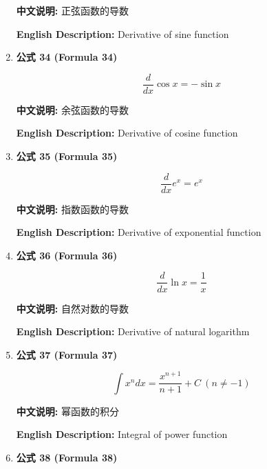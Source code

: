 \documentclass[12pt,a4paper]{article}
\begin{document}
\begin{enumerate}[leftmargin=*]
\textbf{中文说明:} 正弦函数的导数

\textbf{English Description:} Derivative of sine function

\vspace{0.5cm}

\item \textbf{公式 34 (Formula 34)}

\begin{equation}
\frac{d}{dx}\cos x = -\sin x
\end{equation}

\textbf{中文说明:} 余弦函数的导数

\textbf{English Description:} Derivative of cosine function

\vspace{0.5cm}

\item \textbf{公式 35 (Formula 35)}

\begin{equation}
\frac{d}{dx}e^x = e^x
\end{equation}

\textbf{中文说明:} 指数函数的导数

\textbf{English Description:} Derivative of exponential function

\vspace{0.5cm}

\item \textbf{公式 36 (Formula 36)}

\begin{equation}
\frac{d}{dx}\ln x = \frac{1}{x}
\end{equation}

\textbf{中文说明:} 自然对数的导数

\textbf{English Description:} Derivative of natural logarithm

\vspace{0.5cm}

\item \textbf{公式 37 (Formula 37)}

\begin{equation}
\int x^n dx = \frac{x^{n+1}}{n+1} + C\ (n \neq -1)
\end{equation}

\textbf{中文说明:} 幂函数的积分

\textbf{English Description:} Integral of power function

\vspace{0.5cm}

\item \textbf{公式 38 (Formula 38)}


\end{enumerate}
\end{document}
